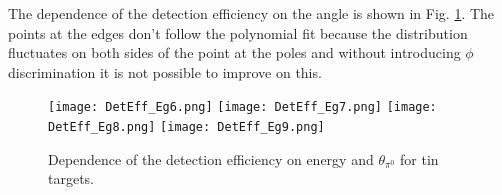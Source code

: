 \indent The dependence of the detection efficiency on the angle is shown in Fig. \ref{detectioneff}. The points at the edges don't follow the polynomial fit because the distribution fluctuates on both sides of the point at the poles and without introducing $\phi$ discrimination it is not possible to improve on this.

\begin{figure}[H]
\begin{center}
\texttt{[image: DetEff\_Eg6.png]}
\texttt{[image: DetEff\_Eg7.png]}
\texttt{[image: DetEff\_Eg8.png]}
\texttt{[image: DetEff\_Eg9.png]}
\caption{Dependence of the detection efficiency on energy and $\theta_{\pi^{0}}$ for tin targets.}
\label{detectioneff}
\end{center}
\end{figure}


